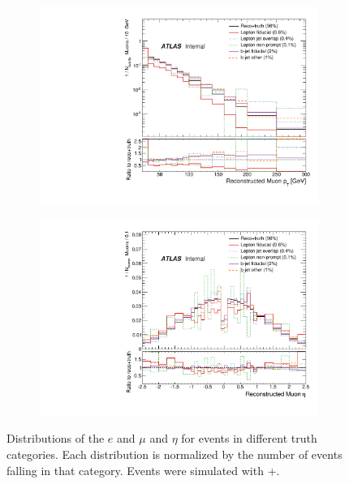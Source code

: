 \begin{figure}
\begin{subfigure}[]{0.45\textwidth}
\includegraphics[width=\textwidth]{fig/RecoNotTruth/MuPt.pdf}
\end{subfigure}
\begin{subfigure}[]{0.45\textwidth}
\includegraphics[width=\textwidth]{fig/RecoNotTruth/MuEta.pdf}
\end{subfigure}
\caption{Distributions of the $e$ and $\mu$ \pt and $\eta$ for events in different truth categories. Each distribution is normalized by the number of events falling in that category. Events were simulated with \pow+\py \ttbar.}
\label{fig:fakeemu}
\end{figure}

